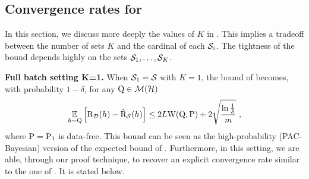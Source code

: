 \begin{noaddcontents}
    \subsection{Convergence rates for }
    \label{sec:discussion-supervised-nnl}
    
    In this section, we discuss more deeply the values of $K$ in . 
    This implies a tradeoff between the number of sets $K$ and the cardinal of each $\S_i$.
    The tightness of the bound depends highly on the sets $\S_1, \dots, \S_K$.
    
    \textbf{Full batch setting K=1.} When $\S_1=\S$ with $K=1$, the bound of  becomes, with probability $1-\delta$, for any $\Q\in\Mcal(\H)$
    \begin{align*}
     \EE_{h\sim\Q}\Big[ \Risk_{\D}(h) - \Riskhat_{\S}(h) \Big] \le 2L\W(\Q, \P) + 2\sqrt{\frac{\ln\frac{1}{\delta}}{m}}\ ,
    \end{align*}
    where $\P=\P_1$ is data-free.
    This bound can be seen as the high-probability (PAC-Bayesian) version of the expected bound of \cite{wang2019information}.
    Furthermore, in this setting, we are able, through our proof technique, to recover an explicit convergence rate similar to the one of \cite[][Theorem 12]{amit2022integral}. It is stated below.
    

\end{noaddcontents}
